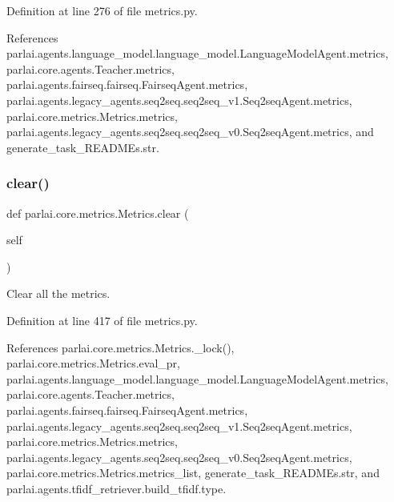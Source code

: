 Definition at line 276 of file metrics.\+py.



References parlai.\+agents.\+language\+\_\+model.\+language\+\_\+model.\+Language\+Model\+Agent.\+metrics, parlai.\+core.\+agents.\+Teacher.\+metrics, parlai.\+agents.\+fairseq.\+fairseq.\+Fairseq\+Agent.\+metrics, parlai.\+agents.\+legacy\+\_\+agents.\+seq2seq.\+seq2seq\+\_\+v1.\+Seq2seq\+Agent.\+metrics, parlai.\+core.\+metrics.\+Metrics.\+metrics, parlai.\+agents.\+legacy\+\_\+agents.\+seq2seq.\+seq2seq\+\_\+v0.\+Seq2seq\+Agent.\+metrics, and generate\+\_\+task\+\_\+\+R\+E\+A\+D\+M\+Es.\+str.

\mbox{\label{classparlai_1_1core_1_1metrics_1_1Metrics_a72759455e9d5ebab2775aed1fa7f952a}} 
\subsubsection{\texorpdfstring{clear()}{clear()}}
{\footnotesize\ttfamily def parlai.\+core.\+metrics.\+Metrics.\+clear (\begin{DoxyParamCaption}\item[{}]{self }\end{DoxyParamCaption})}

\begin{DoxyVerb}Clear all the metrics.\end{DoxyVerb}
 

Definition at line 417 of file metrics.\+py.



References parlai.\+core.\+metrics.\+Metrics.\+\_\+lock(), parlai.\+core.\+metrics.\+Metrics.\+eval\+\_\+pr, parlai.\+agents.\+language\+\_\+model.\+language\+\_\+model.\+Language\+Model\+Agent.\+metrics, parlai.\+core.\+agents.\+Teacher.\+metrics, parlai.\+agents.\+fairseq.\+fairseq.\+Fairseq\+Agent.\+metrics, parlai.\+agents.\+legacy\+\_\+agents.\+seq2seq.\+seq2seq\+\_\+v1.\+Seq2seq\+Agent.\+metrics, parlai.\+core.\+metrics.\+Metrics.\+metrics, parlai.\+agents.\+legacy\+\_\+agents.\+seq2seq.\+seq2seq\+\_\+v0.\+Seq2seq\+Agent.\+metrics, parlai.\+core.\+metrics.\+Metrics.\+metrics\+\_\+list, generate\+\_\+task\+\_\+\+R\+E\+A\+D\+M\+Es.\+str, and parlai.\+agents.\+tfidf\+\_\+retriever.\+build\+\_\+tfidf.\+type.


